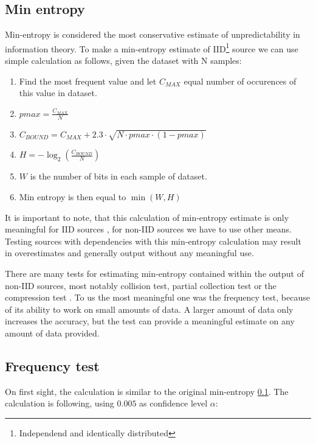\documentclass[
  print, %
  Table,   %
  nolof,     %
  nolot,     %
           oneside
]{fithesis3}
\begin{document}
  \subsection{Min entropy}\label{par:min}
Min-entropy \cite{barker2012recommendation} is considered the most conservative estimate of unpredictability in information theory. To make a min-entropy estimate of IID\footnote{Independend and identically distributed} source we can use simple calculation as follows, given the dataset with N samples:


\begin{enumerate}
  \item Find the most frequent value and let $C_{MAX}$ equal number of occurences of this value in dataset.
  \item $pmax = \frac{C_{MAX}}{N}$
  \item $C_{BOUND}=C_{MAX} + 2.3 \cdot \sqrt{N \cdot pmax \cdot ( 1- pmax)}$
  \item $H = - \log_2 (\frac{C_{BOUND}}{N}) $
  \item $W$ is the number of bits in each sample of dataset.
  \item Min entropy is then equal to $\min(W, H)$

\end{enumerate}

It is important to note, that this calculation of min-entropy estimate is only meaningful for IID sources \cite{barker2012recommendation}, for non-IID sources we have to use other means. Testing sources with dependencies with this min-entropy calculation may result in overestimates and generally output without any meaningful use.

There are many tests for estimating min-entropy contained within the output of non-IID sources, most notably collision test, partial collection test or the compression test \cite{barker2012recommendation}. To us the most meaningful one was the frequency test\cite{barker2012recommendation}, because of its ability to work on small amounts of data. A larger amount of data only increases the accuracy, but the test can provide a meaningful estimate on any amount of data provided.

\subsection{Frequency test}\label{par:freq}
  On first sight, the calculation is similar to the original min-entropy \ref{par:min}. The calculation is following, using $0.005$ as confidence level $\alpha$:
\end{document}
